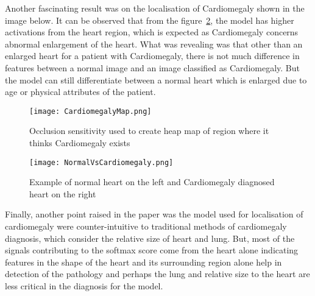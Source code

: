 Another fascinating result was on the localisation of Cardiomegaly shown in the image below. It can be observed that from the figure~\ref{fig:Cardiomegaly}, the model has higher activations from the heart region, which is expected as Cardiomegaly concerns abnormal enlargement of the heart. What was revealing was that other than an enlarged heart for a patient with Cardiomegaly, there is not much difference in features between a normal image and an image classified as Cardiomegaly. But the model can still differentiate between a normal heart which is enlarged due to age or physical attributes of the patient. 
\begin{figure}[H]
	\centering
		\texttt{[image: CardiomegalyMap.png]}
	\caption{Occlusion sensitivity used to create heap map of region where it thinks Cardiomegaly exists }
	\label{fig:HeatMap}
\end{figure}

\begin{figure}[H]
	\centering
	\texttt{[image: NormalVsCardiomegaly.png]}
	\caption{Example of normal heart on the left and Cardiomegaly diagnosed heart on the right }
	\label{fig:Cardiomegaly}
\end{figure}



Finally, another point raised in the paper was the model used for localisation of cardiomegaly were counter-intuitive to traditional methods of cardiomegaly diagnosis, which consider the relative size of heart and lung. But, most of the signals contributing to the softmax score come from the heart alone indicating features in the shape of the heart and its surrounding region alone help in detection of the pathology and perhaps the lung and relative size to the heart are less critical in the diagnosis for the model. 
 

 
 



